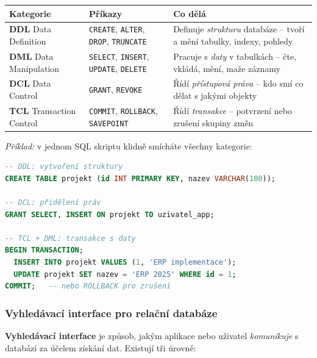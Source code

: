 \begin{center}
\begin{tabular}{p{3.2cm}p{3.8cm}p{5cm}}
\toprule
\textbf{Kategorie} & \textbf{Příkazy} & \textbf{Co dělá} \\
\midrule
\textbf{DDL} \newline Data Definition & \texttt{CREATE}, \texttt{ALTER}, \texttt{DROP}, \texttt{TRUNCATE} &
  Definuje \textit{strukturu} databáze -- tvoří a mění tabulky, indexy, pohledy \\
\midrule
\textbf{DML} \newline Data Manipulation & \texttt{SELECT}, \texttt{INSERT}, \texttt{UPDATE}, \texttt{DELETE} &
  Pracuje s \textit{daty} v tabulkách -- čte, vkládá, mění, maže záznamy \\
\midrule
\textbf{DCL} \newline Data Control & \texttt{GRANT}, \texttt{REVOKE} &
  Řídí \textit{přístupová práva} -- kdo smí co dělat s jakými objekty \\
\midrule
\textbf{TCL} \newline Transaction Control & \texttt{COMMIT}, \texttt{ROLLBACK}, \texttt{SAVEPOINT} &
  Řídí \textit{transakce} -- potvrzení nebo zrušení skupiny změn \\
\bottomrule
\end{tabular}
\end{center}

\textit{Příklad:} v jednom SQL skriptu klidně smícháte všechny kategorie:
\begin{lstlisting}[language=SQL, caption=Příkazy ze všech čtyř kategorií SQL]
-- DDL: vytvoření struktury
CREATE TABLE projekt (id INT PRIMARY KEY, nazev VARCHAR(100));

-- DCL: přidělení práv
GRANT SELECT, INSERT ON projekt TO uzivatel_app;

-- TCL + DML: transakce s daty
BEGIN TRANSACTION;
  INSERT INTO projekt VALUES (1, 'ERP implementace');
  UPDATE projekt SET nazev = 'ERP 2025' WHERE id = 1;
COMMIT;   -- nebo ROLLBACK pro zrušení
\end{lstlisting}

\subsubsection{Vyhledávací interface pro relační databáze}

\textbf{Vyhledávací interface} je způsob, jakým aplikace nebo uživatel \textit{komunikuje} s databází
za účelem získání dat. Existují tři úrovně:

